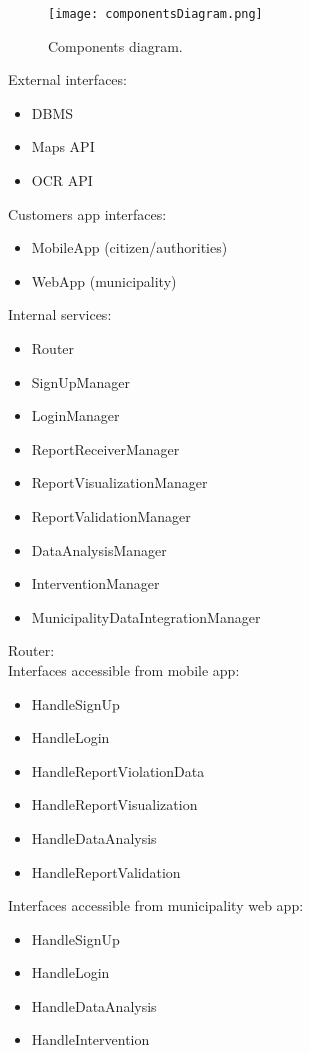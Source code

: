 \begin{figure}[H]
	\centering
	\texttt{[image: componentsDiagram.png]}
	\caption{Components diagram.}
\end{figure}

External interfaces:
\begin{itemize}
	\item DBMS
	\item Maps API
	\item OCR API
\end{itemize}

Customers app interfaces:
\begin{itemize}
	\item MobileApp (citizen/authorities)
	\item WebApp (municipality)
\end{itemize}

Internal services:
\begin{itemize}
	\item Router
	\item SignUpManager
	\item LoginManager
	\item ReportReceiverManager
	\item ReportVisualizationManager
	\item ReportValidationManager
	\item DataAnalysisManager
	\item InterventionManager
	\item MunicipalityDataIntegrationManager
\end{itemize}

\bigskip
Router:\\
Interfaces accessible from mobile app:
\begin{itemize}
	\item HandleSignUp
	\item HandleLogin
	\item HandleReportViolationData
	\item HandleReportVisualization
	\item HandleDataAnalysis
	\item HandleReportValidation
\end{itemize}
Interfaces accessible from municipality web app:
\begin{itemize}
	\item HandleSignUp
	\item HandleLogin
	\item HandleDataAnalysis
	\item HandleIntervention 
\end{itemize}

